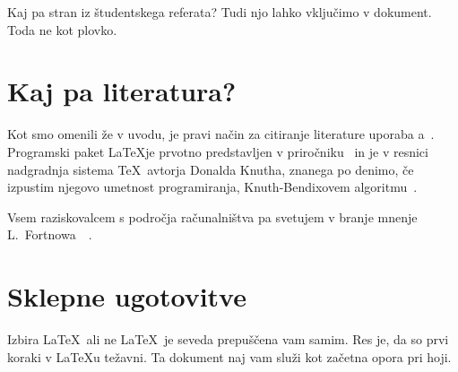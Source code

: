 Kaj pa stran iz študentskega referata?\label{pp}
Tudi njo lahko vključimo v dokument. Toda ne kot plovko.


\chapter{Kaj pa literatura?}
\label{ch3}
Kot smo omenili že v uvodu, je pravi način za citiranje literature uporaba \BibTeX{}a~\cite{bib}.
Programski paket \LaTeX je prvotno predstavljen v priročniku~\cite{lat} in je v resnici nadgradnja sistema \TeX\ avtorja Donalda Knutha, znanega po denimo, če izpustim njegovo umetnost programiranja, Knuth-Bendixovem algoritmu~\cite{dk1}.

Vsem raziskovalcem s področja računalništva pa svetujem v branje mnenje L.\ Fortnowa~\cite{lf}~\cite{trifonova}.

\chapter{Sklepne ugotovitve}
Izbira \LaTeX\ ali ne \LaTeX\ je seveda prepuščena vam samim. Res je, da so prvi koraki v \LaTeX{}u težavni. Ta dokument naj vam služi kot začetna opora pri hoji.
